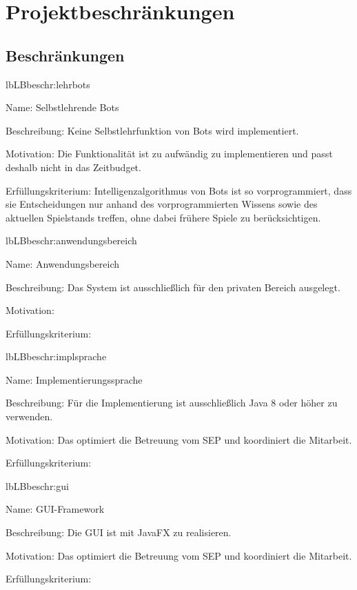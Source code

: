 \chapter{Projektbeschränkungen}

\section{Beschränkungen}

\setcounter{lb}{10}

\begin{description}[leftmargin=5em, style=sameline]
	
	\begin{lhp}{lb}{LB}{beschr:lehrbots}
		\item [Name:] Selbstlehrende Bots
		\item [Beschreibung:] Keine Selbstlehrfunktion von Bots wird implementiert.
		\item [Motivation:] Die Funktionalität ist zu aufwändig zu implementieren und passt deshalb nicht in das Zeitbudget.
		\item [Erfüllungskriterium:] Intelligenzalgorithmus von Bots ist so vorprogrammiert, dass sie Entscheidungen nur anhand des vorprogrammierten Wissens sowie des aktuellen Spielstands treffen, ohne dabei frühere Spiele zu berücksichtigen.
	\end{lhp}
	
	\begin{lhp}{lb}{LB}{beschr:anwendungsbereich}
		\item [Name:] Anwendungsbereich
		\item [Beschreibung:] Das System ist ausschließlich für den privaten Bereich ausgelegt.
		\item [Motivation:] 
		\item [Erfüllungskriterium:] 
	\end{lhp}
	
		
	\begin{lhp}{lb}{LB}{beschr:implsprache}
		\item [Name:] Implementierungssprache
		\item [Beschreibung:] Für die Implementierung ist ausschließlich Java 8 oder höher zu verwenden.
		\item [Motivation:] Das optimiert die Betreuung vom SEP und koordiniert die Mitarbeit.
		\item [Erfüllungskriterium:] 
	\end{lhp}
	
	\begin{lhp}{lb}{LB}{beschr:gui}
		\item [Name:] GUI-Framework
		\item [Beschreibung:] Die GUI ist mit JavaFX zu realisieren.
		\item [Motivation:] Das optimiert die Betreuung vom SEP und koordiniert die Mitarbeit.
		\item [Erfüllungskriterium:] 
	\end{lhp}
	

\end{description}
